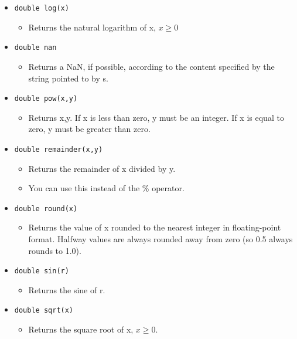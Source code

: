 \begin{itemize}
    \item \texttt{double log(x)}
        \begin{itemize}
            \item Returns the natural logarithm of x, $x \geq 0$ 
        \end{itemize}
    
    \item \texttt{double nan}
        \begin{itemize}
            \item Returns a NaN, if possible, according to the content specified by the string pointed to by s.
        \end{itemize}
    
    \item \texttt{double pow(x,y)}
        \begin{itemize}
            \item Returns x,y. If x is less than zero, y must be an integer. If x is equal to zero, y must be greater than zero.
        \end{itemize}
    
    \item \texttt{double remainder(x,y)}
        \begin{itemize}
            \item Returns the remainder of x divided by y.
            \item You can use this instead of the \% operator.
        \end{itemize}
    
    \item \texttt{double round(x)}
        \begin{itemize}
            \item Returns the value of x rounded to the nearest integer in floating-point format. Halfway values are always rounded away from zero (so 0.5 always rounds to 1.0).
        \end{itemize}
    
    \item \texttt{double sin(r)}
        \begin{itemize}
            \item Returns the sine of r.
        \end{itemize}
    
    \item \texttt{double sqrt(x)}
        \begin{itemize}
            \item Returns the square root of x, $x \geq 0$.
        \end{itemize}
    

\end{itemize}
